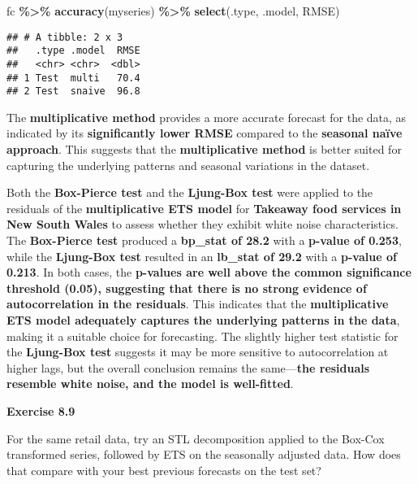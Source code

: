 \documentclass[
]{article}
\newenvironment{Shaded}{\begin{snugshade}}{\end{snugshade}}
\newcommand{\FunctionTok}[1]{\textcolor[rgb]{0.13,0.29,0.53}{\textbf{#1}}}
\newcommand{\NormalTok}[1]{#1}
\newcommand{\SpecialCharTok}[1]{\textcolor[rgb]{0.81,0.36,0.00}{\textbf{#1}}}
\begin{document}
\begin{Shaded}
\begin{Highlighting}[]
\NormalTok{fc }\SpecialCharTok{\%\textgreater{}\%} \FunctionTok{accuracy}\NormalTok{(myseries)  }\SpecialCharTok{\%\textgreater{}\%}
  \FunctionTok{select}\NormalTok{(.type, .model, RMSE)}
\end{Highlighting}
\end{Shaded}

\begin{verbatim}
## # A tibble: 2 x 3
##   .type .model  RMSE
##   <chr> <chr>  <dbl>
## 1 Test  multi   70.4
## 2 Test  snaive  96.8
\end{verbatim}

The \textbf{multiplicative method} provides a more accurate forecast for
the data, as indicated by its \textbf{significantly lower RMSE} compared
to the \textbf{seasonal naïve approach}. This suggests that the
\textbf{multiplicative method} is better suited for capturing the
underlying patterns and seasonal variations in the dataset.

Both the \textbf{Box-Pierce test} and the \textbf{Ljung-Box test} were
applied to the residuals of the \textbf{multiplicative ETS model} for
\textbf{Takeaway food services in New South Wales} to assess whether
they exhibit white noise characteristics. The \textbf{Box-Pierce test}
produced a \textbf{bp\_stat of 28.2} with a \textbf{p-value of 0.253},
while the \textbf{Ljung-Box test} resulted in an \textbf{lb\_stat of
29.2} with a \textbf{p-value of 0.213}. In both cases, the
\textbf{p-values are well above the common significance threshold
(0.05), suggesting that there is no strong evidence of autocorrelation
in the residuals}. This indicates that the \textbf{multiplicative ETS
model adequately captures the underlying patterns in the data}, making
it a suitable choice for forecasting. The slightly higher test statistic
for the \textbf{Ljung-Box test} suggests it may be more sensitive to
autocorrelation at higher lags, but the overall conclusion remains the
same---\textbf{the residuals resemble white noise, and the model is
well-fitted}.

\textbf{Exercise 8.9}

For the same retail data, try an STL decomposition applied to the
Box-Cox transformed series, followed by ETS on the seasonally adjusted
data. How does that compare with your best previous forecasts on the
test set?
\end{document}
